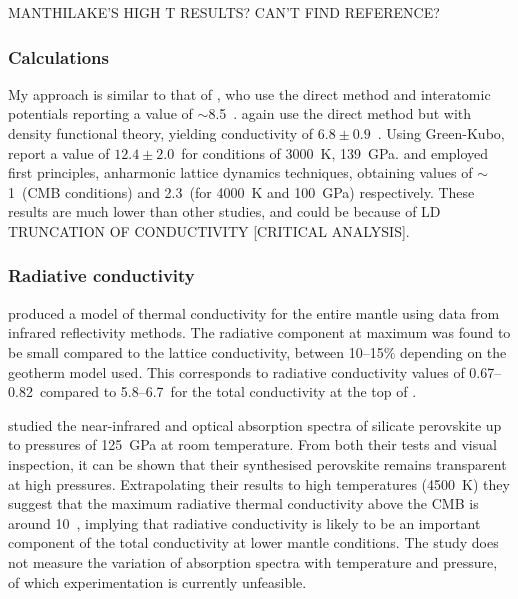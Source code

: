 MANTHILAKE'S HIGH T RESULTS? CAN'T FIND REFERENCE?

\subsubsection{Calculations}

My approach is similar to that of \citet{Ammann2014}, who use the direct method and interatomic potentials reporting a value of $\sim$8.5~\wmk. \citet{Stackhouse2015} again use the direct method but with density functional theory, yielding conductivity of $6.8\pm0.9$~\wmk. Using Green-Kubo, \citet{Haigis2013} report a value of $12.4\pm2.0$~\wmks for conditions of 3000~K, 139~GPa. \citet{Tang2014} and \citet{Dekura2013} employed first principles, anharmonic lattice dynamics techniques, obtaining values of $\sim$1~\wmks (CMB conditions) and 2.3~\wmks (for 4000~K and 100~GPa) respectively. These results are much lower than other studies, and could be because of LD TRUNCATION OF CONDUCTIVITY [CRITICAL ANALYSIS].

















\subsubsection{Radiative conductivity}

\citet{Hofmeister1999} produced a model of thermal conductivity for the entire mantle using data from infrared reflectivity methods. The radiative component at maximum was found to be small compared to the lattice conductivity, between 10--15\% depending on the geotherm model used. This corresponds to radiative conductivity values of 0.67--0.82~\wmks compared to 5.8--6.7~\wmks for the total conductivity at the top of \ddd.

\citet{Keppler2008} studied the near-infrared and optical absorption spectra of silicate perovskite up to pressures of 125~GPa at room temperature. From both their tests and visual inspection, it can be shown that their synthesised perovskite remains transparent at high pressures. Extrapolating their results to high temperatures (4500~K) they suggest that the maximum radiative thermal conductivity above the CMB is around 10~\wmk, implying that radiative conductivity is likely to be an important component of the total conductivity at lower mantle conditions. The study does not measure the variation of absorption spectra with temperature and pressure, of which experimentation is currently unfeasible.

